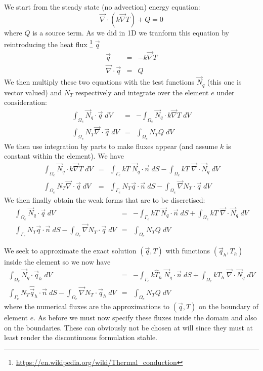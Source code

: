 We start from the steady state (no advection) energy equation:
\[
\vec\nabla\cdot (k \vec\nabla T) + Q = 0
\]
where $Q$ is a source term.
As we did in 1D we tranform this equation by reintroducing the heat flux
\footnote{\url{https://en.wikipedia.org/wiki/Thermal_conduction}} $\vec{q}$ 
\begin{eqnarray}
\vec q &=& - k \vec\nabla T \\
\vec\nabla \cdot \vec q &=& Q
\end{eqnarray}
We then multiply these two equations with the test functions $\vec{N}_q$ (this one 
is vector valued) and 
$N_T$ respectively and integrate over the element $e$ under consideration:
\begin{eqnarray}
\int_{\Omega_e} \vec{N}_q \cdot  \vec q  \; dV &=& - \int_{\Omega_e} \vec{N}_q \cdot k \vec\nabla T\; dV \\
\int_{\Omega_e} N_T \vec\nabla \cdot \vec q \;  dV &=& \int_{\Omega_e} N_T Q \; dV
\end{eqnarray}
We then use integration by parts to make fluxes appear (and assume $k$ is constant within 
the element). We have
\begin{eqnarray}
\int_{\Omega_e} \vec{N}_q \cdot k \vec\nabla T \; dV 
&=& \int_{\Gamma_e} kT \;  \vec{N}_q \cdot \vec{n} \; dS 
- \int _{\Omega_e}  kT \;  \vec\nabla\cdot \vec{N}_q  \;  dV \\
\int_{\Omega_e} N_T \vec\nabla \cdot \vec q \; dV 
&=& \int_{\Gamma_e} {N}_T \vec{q} \cdot \vec{n}  \; dS
- \int_{\Omega_e} \vec\nabla N_T \cdot \vec q \; dV 
\end{eqnarray}
We then finally obtain the weak forms that are to be discretised:
\begin{eqnarray}
\int_{\Omega_e} \vec{N}_q \cdot  \vec q \; dV &=& 
-\int_{\Gamma_e} kT \;  \vec{N}_q \cdot \vec{n} \; dS 
+ \int _{\Omega_e}  kT \;  \vec\nabla\cdot \vec{N}_q  \;  dV \\
\int_{\Gamma_e}    {N}_T  \vec{q}\cdot \vec{n}  \; dS
- \int_{\Omega_e} \vec\nabla N_T \cdot \vec q \; dV 
&=& \int_{\Omega_e} N_T Q \; dV
\end{eqnarray}

We seek to approximate the exact solution $(\vec{q},T)$ with functions $(\vec{q}_h,T_h)$ inside the element so we 
now have 
\begin{eqnarray}
\int_{\Omega_e} \vec{N}_q \cdot  \vec q_h \; dV &=& 
-\int_{\Gamma_e} k \hat{T}_h \;  \vec{N}_q \cdot \vec{n} \; dS 
+ \int _{\Omega_e}  k T_h \;  \vec\nabla\cdot \vec{N}_q  \;  dV \\
\int_{\Gamma_e}    {N}_T \hat{\vec{q}}_h \cdot \vec{n}  \; dS
- \int_{\Omega_e} \vec\nabla N_T \cdot \vec{q}_h \; dV 
&=& \int_{\Omega_e} N_T Q \; dV
\end{eqnarray}
where the numerical fluxes are the approximations to $(\vec{q},T)$ on the boundary of element $e$.
As before we must now specify these fluxes inside the domain and also on the boundaries. These
can obviously not be chosen at will since they must at least render the discontinuous formulation stable.

